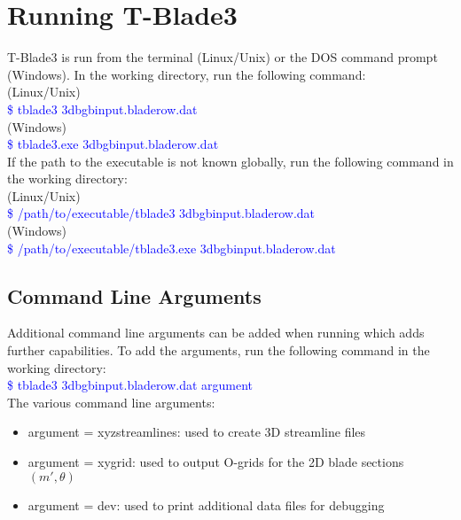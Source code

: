 \documentclass[8pt]{article}
\begin{document}
\section{Running T-Blade3}

\noindent
T-Blade3 is run from the terminal (Linux/Unix) or the DOS command prompt (Windows). In the working directory, run the following command:\\

\noindent
(Linux/Unix)\\
\textcolor{blue}{{\selectfont \$ tblade3 3dbgbinput.bladerow.dat}}\\

\noindent
(Windows)\\
\textcolor{blue}{{\selectfont \$ tblade3.exe 3dbgbinput.bladerow.dat}}\\

\noindent
If the path to the executable is not known globally, run the following command in the working directory:\\

\noindent
(Linux/Unix)\\
\textcolor{blue}{{\selectfont \$ /path/to/executable/tblade3 3dbgbinput.bladerow.dat}}\\

\noindent
(Windows)\\
\textcolor{blue}{{\selectfont \$ /path/to/executable/tblade3.exe 3dbgbinput.bladerow.dat}}

\subsection{Command Line Arguments}\label{cmdargs}
\noindent
Additional command line arguments can be added when running which adds further capabilities. To add the arguments, run the following command in the working directory:\\

\noindent
\textcolor{blue}{{\selectfont \$ tblade3 3dbgbinput.bladerow.dat argument}}\\

\noindent
The various command line arguments:
\begin{itemize}[leftmargin=*]
    \item argument = {\selectfont xyzstreamlines}: used to create 3D streamline files
    \item argument = {\selectfont xygrid}: used to output O-grids for the 2D blade sections $(m',\theta)$
    \item argument = {\selectfont dev}: used to print additional data files for debugging
\end{itemize}
\end{document}
